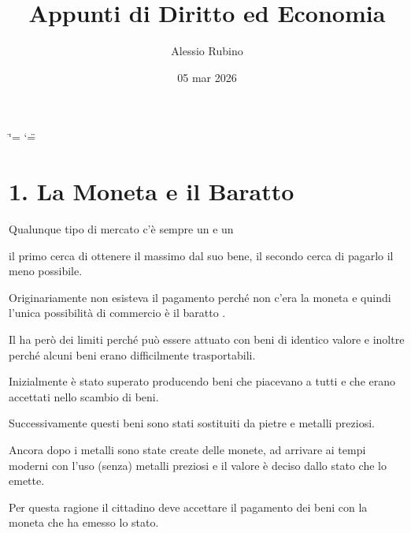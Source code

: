 \documentclass[letterpaper,10pt,italian]{sphinxmanual}
\title{Appunti di Diritto ed Economia}
\date{05 mar 2026}
\author{Alessio Rubino}
\begin{document}
\ifdefined\shorthandoff
  \ifnum\catcode`\=\string=\active\shorthandoff{=}\fi
  \ifnum\catcode`\"=\active{}\fi
\fi

\pagestyle{empty}
\sphinxmaketitle
\pagestyle{plain}
\sphinxtableofcontents
\pagestyle{normal}
\label{\detokenize{index::doc}}


\begin{figure}[htbp]
\centering

\noindent{}
\end{figure}

\sphinxstepscope


\chapter{1. La Moneta e il Baratto}
\label{\detokenize{1.La Moneta:la-moneta-e-il-baratto}}\label{\detokenize{1.La Moneta::doc}}
\begin{figure}[htbp]
\centering

\noindent{}
\end{figure}

\sphinxAtStartPar
Qualunque tipo di mercato c’è sempre un  e un 

\sphinxAtStartPar
il primo cerca di ottenere il massimo dal suo bene,
il secondo cerca di pagarlo il meno possibile.

\sphinxAtStartPar
Originariamente non esisteva il pagamento perché non c’era la moneta e quindi l’unica possibilità
di commercio è il baratto .

\sphinxAtStartPar
Il  ha però dei limiti perché può essere attuato con beni di identico valore e inoltre
perché alcuni beni erano difficilmente trasportabili.

\sphinxAtStartPar
Inizialmente è stato superato producendo beni che piacevano a tutti e che erano accettati nello
scambio di beni.

\sphinxAtStartPar
Successivamente questi beni sono stati sostituiti da pietre e metalli preziosi.

\sphinxAtStartPar
Ancora dopo i metalli sono state create delle monete, ad arrivare ai tempi moderni con l’uso (senza) metalli
preziosi e il valore è deciso dallo stato che lo emette.

\sphinxAtStartPar
Per questa ragione il cittadino deve accettare il pagamento dei beni con la moneta che ha emesso lo stato.
\end{document}
